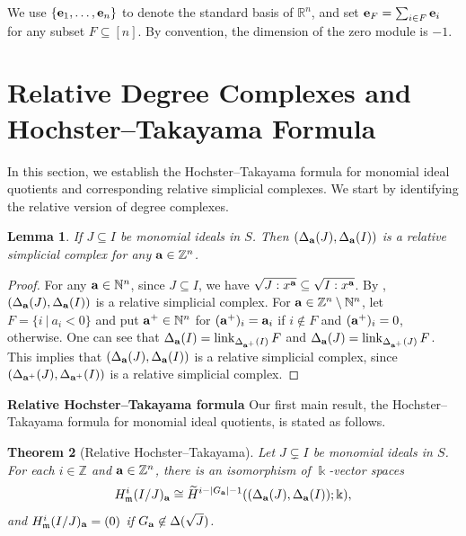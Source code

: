 \documentclass[12pt]{amsart}
\numberwithin{equation}{section}
\newtheorem{theorem}{Theorem}[section]
\newtheorem{lemma}[theorem]{Lemma}
\theoremstyle{definition}
\theoremstyle{definition}
\DeclareMathOperator{\link}{link}
\newcommand{\ZZ}{{\mathbb Z}}
\newcommand{\NN}{{\mathbb N}}
\newcommand{\RR}{{\mathbb R}}
\def\kk{{\Bbbk}}
\def\mm{{\mathfrak m}}
\def\a{{\bold a}}
\def\e{{\bold e}}
\begin{document}
We use $\{\e_1, \dots, \e_n\}$ to denote the standard basis of $\RR^n$, and set $\e_F = \sum_{i \in F} \e_i$ for any subset $F \subseteq [n]$.
By convention, the dimension of the zero module is $-1$. 
	
	
\section{Relative Degree Complexes and Hochster--Takayama Formula} \label{sec.HT}
	
	In this section, we establish the Hochster--Takayama formula for monomial ideal quotients and corresponding relative simplicial complexes. We start by identifying the relative version of degree complexes.

	
\begin{lemma}\label{Key0}
	If $J\subseteq I$ be monomial ideals in $S$. Then $(\Delta_\a(J),\Delta_\a(I))$ is a relative simplicial complex for any $\a\in\ZZ^n$.
\end{lemma}

\begin{proof} For any $\a\in\NN^n$, since $J\subseteq I$, we have $\sqrt{J: x^\a}\subseteq \sqrt{I: x^\a}$. By \cite[Lemma 2.19]{M+2022}, $(\Delta_\a(J),\Delta_\a(I))$ is a relative simplicial complex. For $\a\in\ZZ^n\setminus \NN^n$, let $F=\{i~|~a_i<0\}$ and put $\a^+\in\NN^n$ for $(\a^+)_i=\a_i$ if $i\not\in F$ and $(\a^+)_i=0$, otherwise. One can see that $\Delta_\a(I)=\link_{\Delta_{\a^+}(I)}F$ and $\Delta_\a(J)=\link_{\Delta_{\a^+}(J)}F$. This implies that $(\Delta_\a(J),\Delta_\a(I))$ is a relative simplicial complex, since $(\Delta_{\a^+}(J),\Delta_{\a^+}(I))$ is a relative simplicial complex.
\end{proof}
	
\medskip

\noindent\textbf{Relative Hochster--Takayama formula} Our first main result, the Hochster--Takayama formula for monomial ideal quotients, is stated as follows.

\begin{theorem}[Relative Hochster--Takayama]\label{HochsterTakayama}
	Let $J\subsetneq I$ be monomial ideals in $S$. For each $i\in\ZZ$ and $\a\in\ZZ^n$, there is an isomorphism of $\kk$-vector spaces
	$$H_{\mm}^{i}(I/J)_{\a}\cong \widetilde{H}^{i-|G_\a|-1}((\Delta_\a(J),\Delta_\a(I)); \kk),$$
	and $H_{\mm}^{i}(I/J)_{\a}=(0)$ if $G_\a \not\in \Delta(\sqrt{J})$.
\end{theorem}
\end{document}
